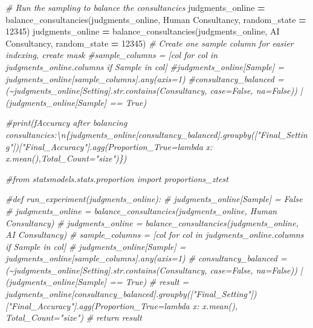 \documentclass[
]{article}
\newenvironment{Shaded}{\begin{snugshade}}{\end{snugshade}}
\newcommand{\CommentTok}[1]{\textcolor[rgb]{0.56,0.35,0.01}{\textit{#1}}}
\newcommand{\DecValTok}[1]{\textcolor[rgb]{0.00,0.00,0.81}{#1}}
\newcommand{\NormalTok}[1]{#1}
\newcommand{\OperatorTok}[1]{\textcolor[rgb]{0.81,0.36,0.00}{\textbf{#1}}}
\newcommand{\StringTok}[1]{\textcolor[rgb]{0.31,0.60,0.02}{#1}}
\begin{document}
\begin{Shaded}
\begin{Highlighting}[]
\CommentTok{\# Run the sampling to balance the consultancies}
\NormalTok{judgments\_online }\OperatorTok{=}\NormalTok{ balance\_consultancies(judgments\_online, }\StringTok{\textquotesingle{}Human Consultancy\textquotesingle{}}\NormalTok{, random\_state }\OperatorTok{=} \DecValTok{12345}\NormalTok{)}
\NormalTok{judgments\_online }\OperatorTok{=}\NormalTok{ balance\_consultancies(judgments\_online, }\StringTok{\textquotesingle{}AI Consultancy\textquotesingle{}}\NormalTok{, random\_state }\OperatorTok{=} \DecValTok{12345}\NormalTok{)}
\CommentTok{\# Create one sample column for easier indexing, create mask}
\CommentTok{\#sample\_columns = [col for col in judgments\_online.columns if \textquotesingle{}Sample\textquotesingle{} in col]}
\CommentTok{\#judgments\_online[\textquotesingle{}Sample\textquotesingle{}] = judgments\_online[sample\_columns].any(axis=1)}
\CommentTok{\#consultancy\_balanced = (\textasciitilde{}judgments\_online[\textquotesingle{}Setting\textquotesingle{}].str.contains(\textquotesingle{}Consultancy\textquotesingle{}, case=False, na=False)) | (judgments\_online[\textquotesingle{}Sample\textquotesingle{}] == True)}

\CommentTok{\#print(f\textquotesingle{}Accuracy after balancing consultancies:\textbackslash{}n\{judgments\_online[consultancy\_balanced].groupby(["Final\_Setting"])["Final\_Accuracy"].agg(Proportion\_True=lambda x: x.mean(),Total\_Count="size")\}\textquotesingle{})}


\CommentTok{\#from statsmodels.stats.proportion import proportions\_ztest}

\CommentTok{\#def run\_experiment(judgments\_online):}
\CommentTok{\#    judgments\_online[\textquotesingle{}Sample\textquotesingle{}] = False}
\CommentTok{\#    judgments\_online = balance\_consultancies(judgments\_online, \textquotesingle{}Human Consultancy\textquotesingle{})}
\CommentTok{\#    judgments\_online = balance\_consultancies(judgments\_online, \textquotesingle{}AI Consultancy\textquotesingle{})}
\CommentTok{\#    sample\_columns = [col for col in judgments\_online.columns if \textquotesingle{}Sample\textquotesingle{} in col]}
\CommentTok{\#    judgments\_online[\textquotesingle{}Sample\textquotesingle{}] = judgments\_online[sample\_columns].any(axis=1)}
\CommentTok{\#    consultancy\_balanced = (\textasciitilde{}judgments\_online[\textquotesingle{}Setting\textquotesingle{}].str.contains(\textquotesingle{}Consultancy\textquotesingle{}, case=False, na=False)) | (judgments\_online[\textquotesingle{}Sample\textquotesingle{}] == True)}
\CommentTok{\#    result = judgments\_online[consultancy\_balanced].groupby(["Final\_Setting"])["Final\_Accuracy"].agg(Proportion\_True=lambda x: x.mean(), Total\_Count="size")}
\CommentTok{\#    return result}


\end{Highlighting}
\end{Shaded}
\end{document}
